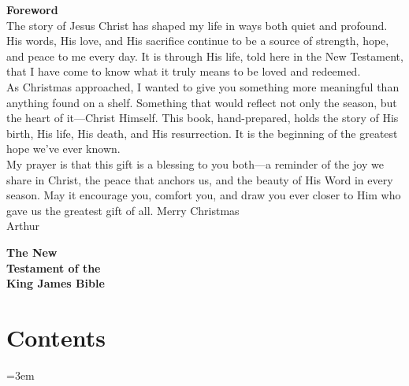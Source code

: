 


\cleardoublepage
\thispagestyle{empty}
\begin{flushleft}
  \vspace*{\fill}
  {\Large\textbf{Foreword}}\\[1em]
  The story of Jesus Christ has shaped my life in ways both quiet and profound. His words, His love, and His sacrifice continue to be a source of strength, hope, and peace to me every day. It is through His life, told here in the New Testament, that I have come to know what it truly means to be loved and redeemed.\\
  \medskip
  As Christmas approached, I wanted to give you something more meaningful than anything found on a shelf. Something that would reflect not only the season, but the heart of it—Christ Himself. This book, hand-prepared, holds the story of His birth, His life, His death, and His resurrection. It is the beginning of the greatest hope we’ve ever known.\\
  \medskip
  My prayer is that this gift is a blessing to you both—a reminder of the joy we share in Christ, the peace that anchors us, and the beauty of His Word in every season. May it encourage you, comfort you, and draw you ever closer to Him who gave us the greatest gift of all.
  \medskip
  Merry Christmas\\
  Arthur
  \vspace*{\fill}
\end{flushleft}
\newpage


\cleardoublepage
\thispagestyle{empty}
\vspace*{\fill}
\begin{center}
{\Huge\bfseries The New}\\[1em]
{\Huge\bfseries Testament of the}\\[1em]
{\Huge\bfseries King James Bible}
\end{center}
\vspace*{\fill}
\clearpage

\cleardoublepage
\renewcommand{\contentsname}{} %
\chapter*{\vspace*{-3em}\centering\Huge Contents\vspace{-1em}}
\vspace*{-2em} %
\tableofcontents*

\twocolumn
{}
\emergencystretch=3em
\sloppy
